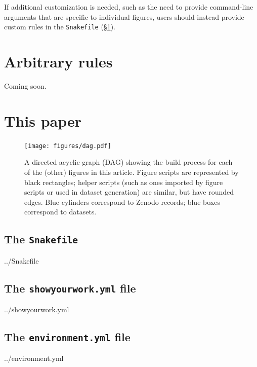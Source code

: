 \documentclass[twocolumn]{aastex631}
\begin{document}
%
If additional customization is needed, such as the need to provide command-line arguments that are specific to individual figures, users should instead provide custom rules in the \texttt{Snakefile} (\S\ref{sec:arbitrary-rules}).

\section{Arbitrary rules}
\label{sec:arbitrary-rules}
%
Coming soon.

\section{This paper}

\begin{figure}[p!]
    \begin{centering}
        \texttt{[image: figures/dag.pdf]}
        \caption{
            A directed acyclic graph (DAG) showing the build process for each of the (other) figures in this article. 
            Figure scripts are represented by black rectangles; helper scripts (such as ones imported by figure scripts or used in dataset generation) are similar, but have rounded edges.
            Blue cylinders correspond to Zenodo records; blue boxes correspond to datasets.
        }
        \label{fig*:dag}
    \end{centering}
\end{figure}

\subsection{The \texttt{Snakefile}}
\label{sec:Snakefile}
%

{../Snakefile}

\subsection{The \texttt{showyourwork.yml} file}
\label{sec:showyourworkyml}
%

{../showyourwork.yml}

\subsection{The \texttt{environment.yml} file}
\label{sec:environmentyml}
%

{../environment.yml}


\end{document}
